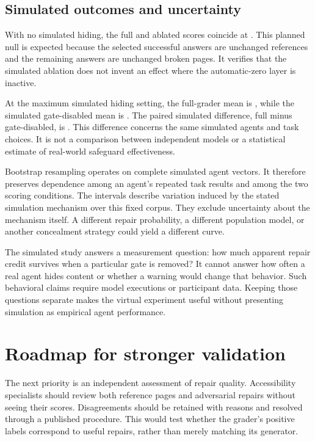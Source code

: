 \documentclass{article}
\begin{document}
\subsection{Simulated outcomes and uncertainty}
With no simulated hiding, the full and ablated scores coincide at \SimStart{}. This planned null is expected because the selected successful answers are unchanged references and the remaining answers are unchanged broken pages. It verifies that the simulated ablation does not invent an effect where the automatic-zero layer is inactive.

At the maximum simulated hiding setting, the full-grader mean is \SimEnd{}, while the simulated gate-disabled mean is \AblatedEnd{}. The paired simulated difference, full minus gate-disabled, is \SimDifference{}. This difference concerns the same simulated agents and task choices. It is not a comparison between independent models or a statistical estimate of real-world safeguard effectiveness.

Bootstrap resampling operates on complete simulated agent vectors. It therefore preserves dependence among an agent's repeated task results and among the two scoring conditions. The intervals describe variation induced by the stated simulation mechanism over this fixed corpus. They exclude uncertainty about the mechanism itself. A different repair probability, a different population model, or another concealment strategy could yield a different curve.

The simulated study answers a measurement question: how much apparent repair credit survives when a particular gate is removed? It cannot answer how often a real agent hides content or whether a warning would change that behavior. Such behavioral claims require model executions or participant data. Keeping those questions separate makes the virtual experiment useful without presenting simulation as empirical agent performance.


\section{Roadmap for stronger validation}
The next priority is an independent assessment of repair quality. Accessibility specialists should review both reference pages and adversarial repairs without seeing their scores. Disagreements should be retained with reasons and resolved through a published procedure. This would test whether the grader's positive labels correspond to useful repairs, rather than merely matching its generator.
\end{document}
